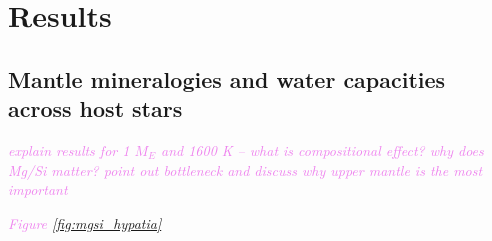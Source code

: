 \documentclass[linenumbers]{aastex631}
\newcommand{\todo}[1]{\textit{\textcolor{violet}{{#1}}}}
\begin{document}






\section{Results}

\subsection{Mantle mineralogies and water capacities across host stars}

\todo{explain results for 1 $M_E$ and 1600 K -- what is compositional effect? why does Mg/Si matter? point out bottleneck and discuss why upper mantle is the most important}

\todo{Figure \ref{fig:mgsi_hypatia}}
\end{document}
